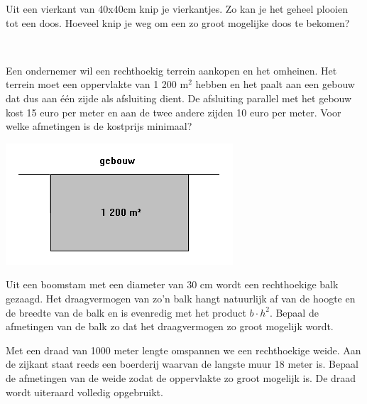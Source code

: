 \documentclass[a4paper,12pt,twoside]{article}
\begin{document}
\begin{oefening}
  Uit een vierkant van 40x40cm knip je vierkantjes. Zo kan je het geheel plooien tot een doos. Hoeveel knip je weg om een zo groot mogelijke doos te bekomen?
\end{oefening}

\begin{oefening}\\
  \begin{minipage}{0.6\textwidth}
    Een ondernemer wil een rechthoekig terrein aankopen en het omheinen. Het terrein moet een oppervlakte van 1 200 m$^2$ hebben en het paalt aan een gebouw dat dus aan één zijde als afsluiting dient. De afsluiting parallel met het gebouw kost 15 euro per meter en aan de twee andere zijden 10 euro per meter. Voor welke afmetingen is de kostprijs minimaal?
  \end{minipage}
  \begin{minipage}{0.4\textwidth}
    \centering
    \includegraphics[width=\textwidth]{terrein-omheinen}
  \end{minipage}
\end{oefening}

\begin{oefening}
  Uit een boomstam met een diameter van 30 cm wordt een rechthoekige balk gezaagd. Het draagvermogen van zo'n balk hangt natuurlijk af van de hoogte en de breedte van de balk en is evenredig met het product $b\cdot h^2$. Bepaal de afmetingen van de balk zo dat het draagvermogen zo groot mogelijk wordt.
\end{oefening}

\begin{oefening}
  Met een draad van 1000 meter lengte omspannen we een rechthoekige weide. Aan de zijkant staat reeds een boerderij waarvan de langste muur 18 meter is. Bepaal de afmetingen van de weide zodat de oppervlakte zo groot mogelijk is. De draad wordt uiteraard volledig opgebruikt.
\end{oefening}
\end{document}
